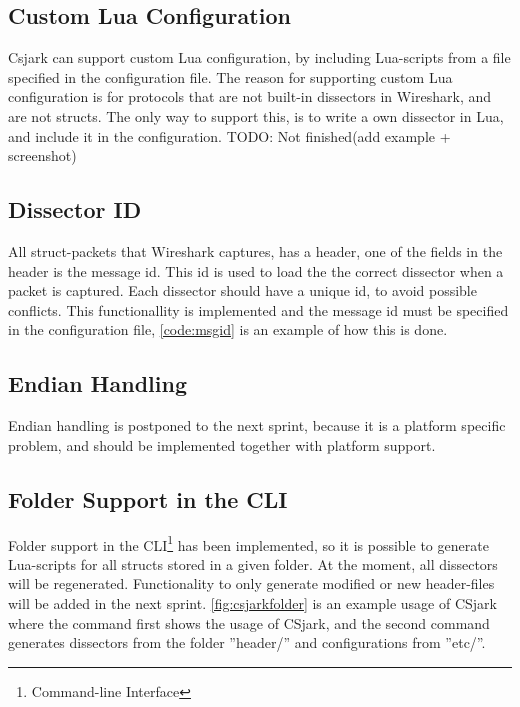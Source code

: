 

\subsection{Custom Lua Configuration}
Csjark can support custom Lua configuration, by including Lua-scripts from a 
file specified in the configuration file. The reason for supporting custom Lua 
configuration is for protocols that are not built-in dissectors in Wireshark, 
and are not structs. The only way to support this, is to write a own dissector 
in Lua, and include it in the configuration. 
TODO: Not finished(add example + screenshot)

\subsection{Dissector ID}
All struct-packets that Wireshark captures, has a header, one of the fields in 
the header is the message id. This id is used to load the the correct 
dissector when a packet is captured. Each dissector should have a unique id, 
to avoid possible conflicts. This functionallity is implemented and the 
message id must be specified in the configuration file, \autoref{code:msgid} 
is an example of how this is done.



\subsection{Endian Handling}
Endian handling is postponed to the next sprint, because it is a platform 
specific problem, and should be implemented together with platform support.

\subsection{Folder Support in the CLI}
Folder support in the CLI\footnote{Command-line Interface} has been 
implemented, so it is possible to generate Lua-scripts for all structs stored 
in a given folder. At the moment, all dissectors will be regenerated. 
Functionality to only generate modified or new header-files will be added in 
the next sprint. \autoref{fig:csjarkfolder} is an example usage of CSjark where
the command first shows the usage of CSjark, and the second command 
generates dissectors from the folder ''header/'' and configurations from ''etc/''.

